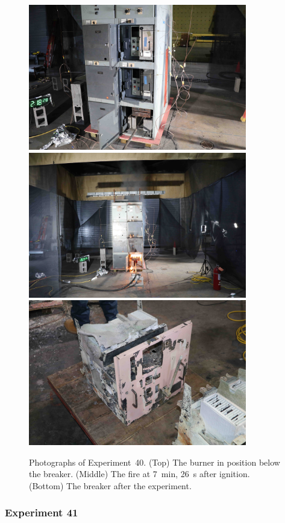 \begin{figure}[p]
\centering
\includegraphics[height=2.50in]{../FIGURES/Test_40_setup} \\
\includegraphics[height=2.50in]{../FIGURES/Test_40_7_min_26_s} \\
\includegraphics[height=2.50in]{../FIGURES/Test_40_breaker}
\caption[Photographs of Experiment~40]{Photographs of Experiment~40. (Top) The burner in position below the breaker. (Middle) The fire at 7~min, 26~s after ignition. (Bottom) The breaker after the experiment.}
\label{fig:Test_40_photos}
\end{figure}


\clearpage

\subsubsection{Experiment 41}

